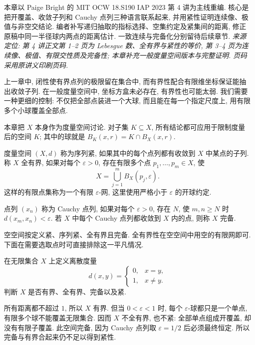 \label{ch:compact}

本章以 Paige Bright 的 MIT OCW 18.S190 IAP 2023 第 4 讲为主线重编. 核心是把开覆盖、收敛子列和 Cauchy 点列三种语言联系起来, 并用紧性证明连续像、极值与非空交结论. 编者补写递归抽取的指标选择、空集约定及紧集间的距离, 修正原稿中同一半径球内两点的距离估计. 一致连续与完备化分别留待后续章节.
\emph{来源定位: 第 4 讲正文第 1--2 页为 Lebesgue 数、全有界与紧性的等价, 第 3--4 页为连续像、极值、有限交性质及完备性; 本章补充一般度量空间版本与完整证明. 页码采用原讲义印刷页码.}

\label{ch:compact:three-languages}

上一章中, 闭性使有界点列的极限留在集合中, 而有界性配合有限维坐标保证能抽出收敛子列. 在一般度量空间中, 坐标方盒未必存在, 有界性也可能太弱. 我们需要一种更细的控制: 不仅把全部点装进一个大球, 而且能在每一个指定尺度上, 用有限多个小球覆盖全部点.

本章把 $X$ 本身作为度量空间讨论. 对子集 $K\subseteq X$, 所有结论都可应用于限制度量后的空间 $K$; 其中的球就是 $B_K(x,r)=K\cap B_X(x,r)$.

\begin{definition}
度量空间 $(X,d)$ 称为序列紧, 如果其中的每个点列都有收敛到 $X$ 中某点的子列. 称 $X$ 全有界, 如果对每个 $\varepsilon>0$, 存在有限多个点 $p_1,\ldots,p_m\in X$, 使
\[
 X=\bigcup_{j=1}^mB_X(p_j,\varepsilon).
\]
这样的有限点集称为一个有限 $\varepsilon$-网, 这里使用严格小于 $\varepsilon$ 的开球约定.

点列 $(x_n)$ 称为 Cauchy 点列, 如果对每个 $\varepsilon>0$, 存在 $N$, 使 $m,n\geq N$ 时 $d(x_m,x_n)<\varepsilon$. 若 $X$ 中每个 Cauchy 点列都收敛到 $X$ 内的点, 则称 $X$ 完备.
\end{definition}

空空间按定义紧、序列紧、全有界且完备. 全有界性在空空间中用空的有限网即可. 下面在需要选取点时可直接排除这一平凡情况.

\begin{example}
在无限集合 $X$ 上定义离散度量
\[
 d(x,y)=\begin{cases}0,&x=y,\\1,&x\ne y.\end{cases}
\]
判断 $X$ 是否有界、全有界、完备以及紧.
\end{example}
\begin{solution}
所有距离都不超过 $1$, 所以 $X$ 有界. 但当 $0<\varepsilon<1$ 时, 每个 $\varepsilon$-球都只是一个单点, 有限多个球不能覆盖无限集合. 因而 $X$ 不全有界, 也不紧: 全部单点组成开覆盖, 却没有有限子覆盖. 此空间完备, 因为 Cauchy 点列取 $\varepsilon=1/2$ 后必须最终恒定. 所以完备与有界合起来仍不足以得到紧性.
\end{solution}


